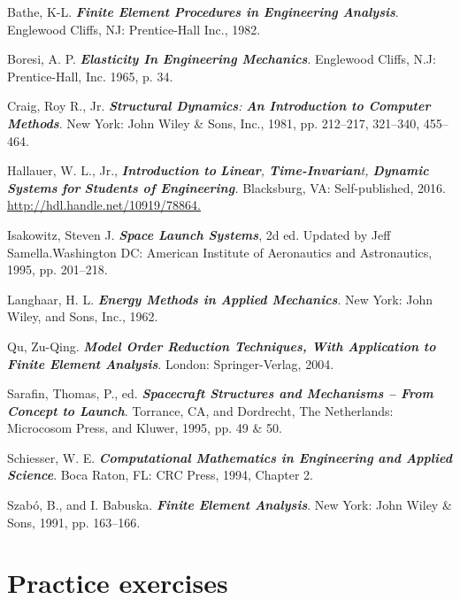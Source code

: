 \documentclass{AeroStructure-ERJohnson}
\begin{document}
\begin{thebibliography}{}\label{sec18.10}
\bibitem{}
Bathe, K-L. \textit{\textbf{Finite Element Procedures in Engineering Analysis}}. Englewood Cliffs, NJ: Prentice-Hall Inc., 1982.\label{Bathe}

\bibitem{}
Boresi, A. P. \textit{\textbf{Elasticity In Engineering Mechanics}}. Englewood Cliffs, N.J: Prentice-Hall, Inc. 1965, p. 34.

\bibitem{}
Craig, Roy R., Jr. \textit{\textbf{Structural Dynamics}:} \textit{\textbf{An Introduction to Computer Methods}}. New York: John Wiley \& Sons, Inc., 1981, pp. 212--217, 321--340, 455--464.\label{Craig}

\bibitem{}
Hallauer, W. L., Jr., \textit{\textbf{Introduction to} \textbf{Linear}, \textbf{Time-Invarian}t, \textbf{Dynamic Systems} \textbf{for} \textbf{Students of Engineering}.} Blacksburg, VA: Self-published, 2016. \url{http://hdl.handle.net/10919/78864.}

\bibitem{}
Isakowitz, Steven J. \textit{\textbf{Space Launch Systems}}, 2d ed. Updated by Jeff Samella.Washington DC: American Institute of Aeronautics and Astronautics, 1995, pp. 201--218.

\bibitem{}
Langhaar, H. L. \textit{\textbf{Energy Methods in Applied Mechanics}}. New York: John Wiley, and Sons, Inc., 1962.\label{Langhaar}

\bibitem{}
Qu, Zu-Qing. \textit{\textbf{Model Order Reduction Techniques, With Application to Finite Element Analysis}}. London: Springer-Verlag, 2004.\label{Qu2004}

\bibitem{}
Sarafin, Thomas, P., ed. \textit{\textbf{Spacecraft Structures and Mechanisms – From Concept to Launch}}. Torrance, CA, and Dordrecht, The Netherlands: Microcosom Press, and Kluwer, 1995, pp. 49 \& 50.\label{Sarafin1995}

\bibitem{}
Schiesser, W. E. \textit{\textbf{Computational Mathematics in Engineering and Applied Science}}. Boca Raton, FL: CRC Press, 1994, Chapter 2.

\bibitem{}
Szabó, B., and I. Babuska. \textit{\textbf{Finite Element Analysis}}. New York: John Wiley \& Sons, 1991, pp. 163--166.
\end{thebibliography}

\pagebreak

\section{Practice exercises}\label{sec18.11}
\end{document}
